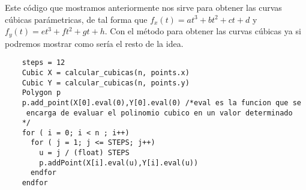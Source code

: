 Este c\'odigo que mostramos anteriormente nos sirve para obtener las curvas c\'ubicas
par\'ametricas, de tal forma que $f_x(t) = at^3+bt^2+ct+d$ y $f_y(t) = et^3+ft^2+gt+h$.
Con el m\'etodo para obtener las curvas c\'ubicas ya si podremos mostrar
como ser\'ia el resto de la idea.
\begin{verbatim}
    steps = 12
    Cubic X = calcular_cubicas(n, points.x)
    Cubic Y = calcular_cubicas(n, points.y)
    Polygon p
    p.add_point(X[0].eval(0),Y[0].eval(0) /*eval es la funcion que se
     encarga de evaluar el polinomio cubico en un valor determinado
    */
    for ( i = 0; i < n ; i++)
      for ( j = 1; j <= STEPS; j++)
        u = j / (float) STEPS
        p.addPoint(X[i].eval(u),Y[i].eval(u))
      endfor
    endfor
\end{verbatim}


